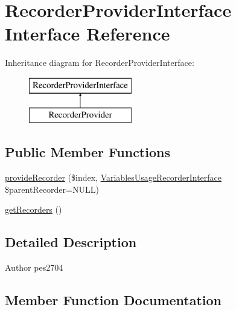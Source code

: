 \hypertarget{interface_pes_1_1_view_1_1_recorder_1_1_recorder_provider_interface}{}\section{Recorder\+Provider\+Interface Interface Reference}
\label{interface_pes_1_1_view_1_1_recorder_1_1_recorder_provider_interface}
Inheritance diagram for Recorder\+Provider\+Interface\+:\begin{figure}[H]
\begin{center}
\leavevmode
\includegraphics[height=2.000000cm]{interface_pes_1_1_view_1_1_recorder_1_1_recorder_provider_interface}
\end{center}
\end{figure}
\subsection*{Public Member Functions}
\begin{DoxyCompactItemize}
\item 
\mbox{\hyperlink{interface_pes_1_1_view_1_1_recorder_1_1_recorder_provider_interface_a3a845b7c3190054b0443ad6d53022756}{provide\+Recorder}} (\$index, \mbox{\hyperlink{interface_pes_1_1_view_1_1_recorder_1_1_variables_usage_recorder_interface}{Variables\+Usage\+Recorder\+Interface}} \$parent\+Recorder=N\+U\+LL)
\item 
\mbox{\hyperlink{interface_pes_1_1_view_1_1_recorder_1_1_recorder_provider_interface_ad8b2b29a9520c160fd7b09907bd01e27}{get\+Recorders}} ()
\end{DoxyCompactItemize}


\subsection{Detailed Description}
\begin{DoxyAuthor}{Author}
pes2704 
\end{DoxyAuthor}


\subsection{Member Function Documentation}
\mbox{\label{interface_pes_1_1_view_1_1_recorder_1_1_recorder_provider_interface_ad8b2b29a9520c160fd7b09907bd01e27}} 
